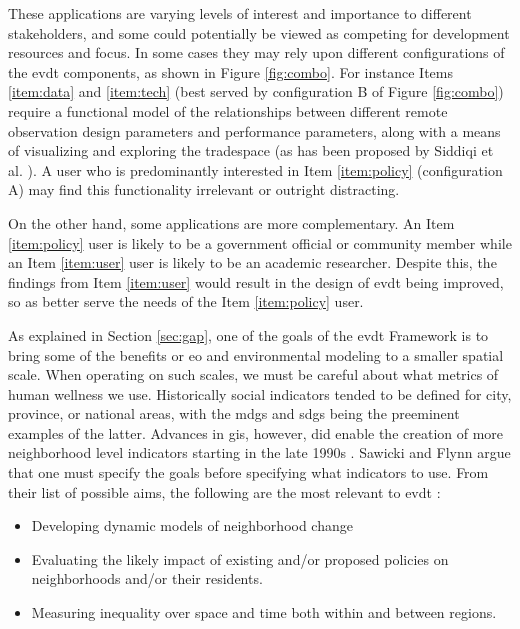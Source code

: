 These applications are varying levels of interest and importance to different stakeholders, and some could potentially be viewed as competing for development resources and focus. In some cases they may rely upon different configurations of the \ac{evdt} components, as shown in Figure \ref{fig:combo}. For instance Items \ref{item:data} and \ref{item:tech} (best served by configuration B of Figure \ref{fig:combo}) require a functional model of the relationships between different remote observation design parameters and performance parameters, along with a means of visualizing and exploring the tradespace (as has been proposed by Siddiqi et al. \cite{siddiqiValuingNewEarth2019}). A user who is predominantly interested in Item \ref{item:policy} (configuration A) may find this functionality irrelevant or outright distracting.

On the other hand, some applications are more complementary. An Item \ref{item:policy} user is likely to be a government official or community member while an Item \ref{item:user} user is likely to be an academic researcher. Despite this, the findings from Item \ref{item:user} would result in the design of \ac{evdt} being improved, so as better serve the needs of the Item \ref{item:policy} user.

As explained in Section \ref{sec:gap}, one of the goals of the \ac{evdt} Framework is to bring some of the benefits or \ac{eo} and environmental modeling to a smaller spatial scale. When operating on such scales, we must be careful about what metrics of human wellness we use. Historically social indicators tended to be defined for city, province, or national areas, with the \acp{mdg} and \acp{sdg} being the preeminent examples of the latter. Advances in \ac{gis}, however, did enable the creation of more neighborhood level indicators starting in the late 1990s \cite{sawickiNeighborhoodIndicatorsReview1996}. Sawicki and Flynn argue that one must specify the goals before specifying what indicators to use. From their list of possible aims, the following are the most relevant to \ac{evdt} \cite{sawickiNeighborhoodIndicatorsReview1996}:

\begin{itemize}[itemsep=0pt,parsep=0pt]
	\item{Developing dynamic models of neighborhood change}
	\item{Evaluating the likely impact of existing and/or proposed policies on neighborhoods and/or their residents.}
	\item{Measuring inequality over space and time both within and between regions.}
\end{itemize}


